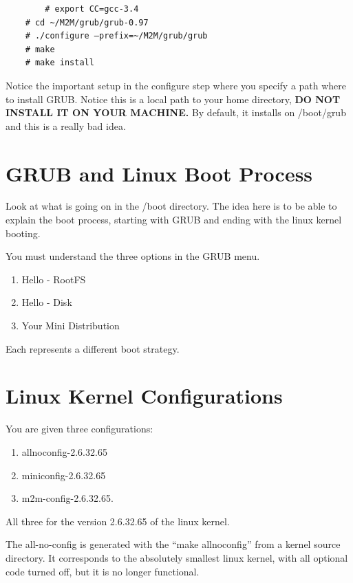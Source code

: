 \documentclass[10]{article}
\begin{document}
{\em\small
\begin{verbatim}
        # export CC=gcc-3.4
	# cd ~/M2M/grub/grub-0.97
	# ./configure –prefix=~/M2M/grub/grub
	# make
	# make install 
\end{verbatim}
}

Notice the important setup in the configure step
where you specify a path where to install GRUB.
Notice this is a local path to your home directory,
{\bf DO NOT INSTALL IT ON YOUR MACHINE.}
By default, it installs on /boot/grub
and this is a really bad idea.

\section{GRUB and Linux Boot Process}

Look at what is going on in the /boot directory.
The idea here is to be able to explain the boot process,
starting with GRUB and ending with the linux kernel booting.

You must understand the three options in the GRUB menu.

\begin{enumerate}
\item
Hello - RootFS
\item
Hello - Disk
\item
Your Mini Distribution
\end{enumerate}

Each represents a different boot strategy.

\section{Linux Kernel Configurations}
\label{sec:linux:kernel:config}

You are given three configurations:

\begin{enumerate}
\item allnoconfig-2.6.32.65
\item miniconfig-2.6.32.65
\item m2m-config-2.6.32.65.
\end{enumerate}

All three for the version 2.6.32.65 of the linux kernel.

The all-no-config is generated with the ``make allnoconfig''
from a kernel source directory. It corresponds to the absolutely
smallest linux kernel, with all optional code turned off,
but it is no longer functional.
\end{document}
